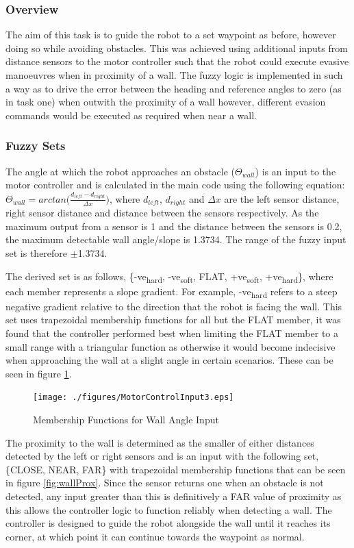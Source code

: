\documentclass[10pt]{article}
\begin{document}
\subsubsection{Overview}
The aim of this task is to guide the robot to a set waypoint as before, however doing so while avoiding obstacles.
This was achieved using additional inputs from distance sensors to the motor controller such that the robot could execute evasive manoeuvres when in proximity of a wall.
The fuzzy logic is implemented in such a way as to drive the error between the heading and reference angles to zero (as in task one) when outwith the proximity of a wall however, different evasion commands would be executed as required when near a wall.

\subsubsection{Fuzzy Sets}
The angle at which the robot approaches an obstacle ($\Theta_{wall}$) is an input to the motor controller and is calculated in the main code using the following equation:
$\Theta_{wall} = arctan\bigg(\frac{d_{left}-d_{right}}{\Delta x}\bigg)$,
where $d_{left}$, $d_{right}$ and $\Delta x$ are the left sensor distance, right sensor distance and distance between the sensors respectively.
As the maximum output from a sensor is 1 and the distance between the sensors is 0.2, the maximum detectable wall angle/slope is 1.3734. 
The range of the fuzzy input set is therefore $\pm$1.3734.

\medskip
The derived set is as follows, \{-ve\textsubscript{hard}, -ve\textsubscript{soft}, FLAT, +ve\textsubscript{soft}, +ve\textsubscript{hard}\}, where each member represents a slope gradient.
For example, -ve\textsubscript{hard} refers to a steep negative gradient relative to the direction that the robot is facing the wall.
This set uses trapezoidal membership functions for all but the FLAT member, it was found that the controller performed best when limiting the FLAT member to a small range with a triangular function as otherwise it would become indecisive when approaching the wall at a slight angle in certain scenarios. 
These can be seen in figure \ref{fig:wallSlope}.
\begin{figure}[H]
    \centering
\texttt{[image: ./figures/MotorControlInput3.eps]}
\caption{Membership Functions for Wall Angle Input}
\label{fig:wallSlope}
\end{figure}

The proximity to the wall is determined as the smaller of either distances detected by the left or right sensors and is an input with the following set, \{CLOSE, NEAR, FAR\} with trapezoidal membership functions that can be seen in figure \ref{fig:wallProx}.
Since the sensor returns one when an obstacle is not detected, any input greater than this is definitively a FAR value of proximity as this allows the controller logic to function reliably when detecting a wall. 
The controller is designed to guide the robot alongside the wall until it reaches its corner, at which point it can continue towards the waypoint as normal.
\end{document}

